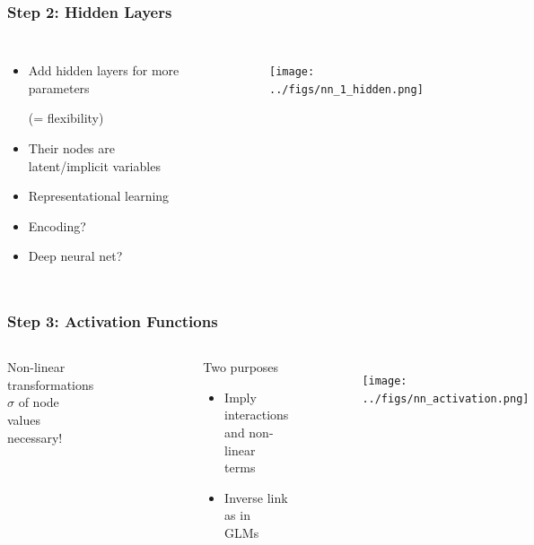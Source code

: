 \documentclass[
    utf8,
    aspectratio=169
]{beamer}  %
\begin{document}
\begin{frame}
	\frametitle{Step 2: Hidden Layers}
	\begin{columns}
		\begin{itemize}
			\item Add \alert{hidden layers} for more parameters 
			
			(= flexibility)
			\item Their nodes are latent/implicit variables
			\item Representational learning
			\item \small{\alert{Encoding}?}
			\item \small{\alert{Deep} neural net?}
		\end{itemize}
		\begin{example}
		\end{example}
		\begin{figure}
			\texttt{[image: ../figs/nn\_1\_hidden.png]}
		\end{figure}
	\end{columns}
\end{frame}

\begin{frame}
	\frametitle{Step 3: Activation Functions}
	\begin{columns}
		\column{0.33\textwidth}
		Non-linear transformations $\sigma$ of node values necessary!
		\begin{figure}
			\includegraphics[width=0.8\textwidth]{pics/activation_functions.png}
		\end{figure}
	
		\begin{block}{Two purposes}
			\begin{itemize}
				\item Imply interactions and non-linear terms
				\item Inverse link as in GLMs
			\end{itemize}
		\end{block}
		\begin{example}
		\end{example}
		\column{0.67\textwidth}
		\begin{figure}
			\texttt{[image: ../figs/nn\_activation.png]}
		\end{figure}
	\end{columns}
\end{frame}
\end{document}
